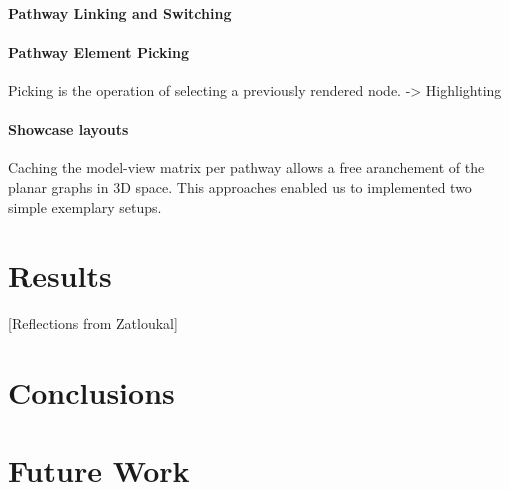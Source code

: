 \subsubsection{Pathway Linking and Switching}



\subsubsection{Pathway Element Picking}

Picking is the operation of selecting a previously rendered node. 
-> Highlighting

\citep{Shreiner2005}

\subsubsection{Showcase layouts}

Caching the model-view matrix per pathway allows a free aranchement of the planar graphs in 3D space.
This approaches enabled us to implemented two simple exemplary setups.



\chapter{Results}

[Reflections from Zatloukal]

\chapter{Conclusions}

\chapter{Future Work}



